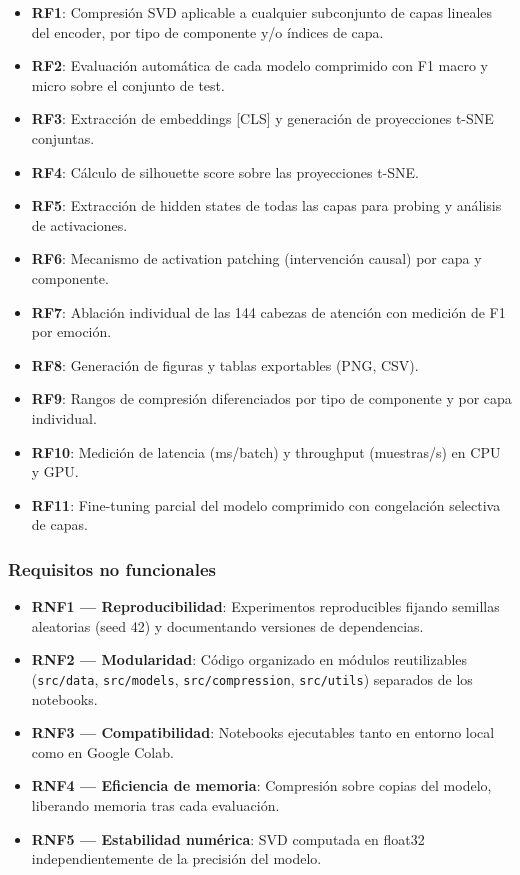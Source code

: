 \documentclass[11pt, a4paper]{article}
\begin{document}
\begin{itemize}[nosep]
    \item \textbf{RF1}: Compresión SVD aplicable a cualquier subconjunto de capas lineales del encoder, por tipo de componente y/o índices de capa.
    \item \textbf{RF2}: Evaluación automática de cada modelo comprimido con F1 macro y micro sobre el conjunto de test.
    \item \textbf{RF3}: Extracción de embeddings [CLS] y generación de proyecciones t-SNE conjuntas.
    \item \textbf{RF4}: Cálculo de silhouette score sobre las proyecciones t-SNE.
    \item \textbf{RF5}: Extracción de hidden states de todas las capas para probing y análisis de activaciones.
    \item \textbf{RF6}: Mecanismo de activation patching (intervención causal) por capa y componente.
    \item \textbf{RF7}: Ablación individual de las 144 cabezas de atención con medición de F1 por emoción.
    \item \textbf{RF8}: Generación de figuras y tablas exportables (PNG, CSV).
    \item \textbf{RF9}: Rangos de compresión diferenciados por tipo de componente y por capa individual.
    \item \textbf{RF10}: Medición de latencia (ms/batch) y throughput (muestras/s) en CPU y GPU.
    \item \textbf{RF11}: Fine-tuning parcial del modelo comprimido con congelación selectiva de capas.
\end{itemize}

\subsubsection{Requisitos no funcionales}

\begin{itemize}[nosep]
    \item \textbf{RNF1 --- Reproducibilidad}: Experimentos reproducibles fijando semillas aleatorias (seed 42) y documentando versiones de dependencias.
    \item \textbf{RNF2 --- Modularidad}: Código organizado en módulos reutilizables (\texttt{src/data}, \texttt{src/models}, \texttt{src/compression}, \texttt{src/utils}) separados de los notebooks.
    \item \textbf{RNF3 --- Compatibilidad}: Notebooks ejecutables tanto en entorno local como en Google Colab.
    \item \textbf{RNF4 --- Eficiencia de memoria}: Compresión sobre copias del modelo, liberando memoria tras cada evaluación.
    \item \textbf{RNF5 --- Estabilidad numérica}: SVD computada en float32 independientemente de la precisión del modelo.
\end{itemize}
\end{document}
